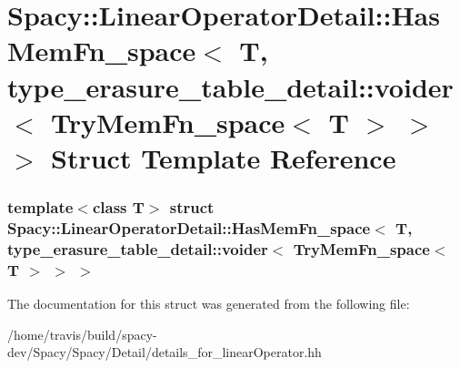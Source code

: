\hypertarget{structSpacy_1_1LinearOperatorDetail_1_1HasMemFn__space_3_01T_00_01type__erasure__table__detail_173d025edf787090eef8ad67224072e46}{\section{\-Spacy\-:\-:\-Linear\-Operator\-Detail\-:\-:\-Has\-Mem\-Fn\-\_\-space$<$ \-T, type\-\_\-erasure\-\_\-table\-\_\-detail\-:\-:voider$<$ \-Try\-Mem\-Fn\-\_\-space$<$ \-T $>$ $>$ $>$ \-Struct \-Template \-Reference}
\label{structSpacy_1_1LinearOperatorDetail_1_1HasMemFn__space_3_01T_00_01type__erasure__table__detail_173d025edf787090eef8ad67224072e46}
}
\subsubsection*{template$<$class T$>$ struct Spacy\-::\-Linear\-Operator\-Detail\-::\-Has\-Mem\-Fn\-\_\-space$<$ T, type\-\_\-erasure\-\_\-table\-\_\-detail\-::voider$<$ Try\-Mem\-Fn\-\_\-space$<$ T $>$ $>$ $>$}



\-The documentation for this struct was generated from the following file\-:\begin{DoxyCompactItemize}
\item 
/home/travis/build/spacy-\/dev/\-Spacy/\-Spacy/\-Detail/details\-\_\-for\-\_\-linear\-Operator.\-hh\end{DoxyCompactItemize}
